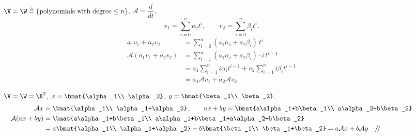 \begin{example}\leavevmode{}
$\V=\W \triangleq \{\text{polynomials with degree} \le n\}$, \quad $\mathcal{A} = \dfrac{d}{dt}$,
\[
v_1=\sum_{i=0}^{n}\alpha_i t^i, \qquad v_2=\sum_{i=0}^{n}\beta_i t^i .
\]
\begin{align*}
a_1v_1+a_2v_2 &= \sum_{i=0}^{n}(a_1\alpha_i+a_2\beta_i)\,t^i\\
\mathcal{A}(a_1v_1+a_2v_2) &= \sum_{i=1}^{n}(a_1\alpha_i+a_2\beta_i)\cdot i\, t^{i-1}\\
&= a_1\sum_{i=1}^{n} i\alpha_i t^{i-1} + a_2\sum_{i=1}^{n} i\beta_i t^{i-1}\\
&= a_1\mathcal{A}v_1+a_2\mathcal{A}v_2
\end{align*}
\end{example}

\begin{example}
$\V=\W=\R^2$, \quad $x=\bmat{\alpha_1\\ \alpha_2}$, \quad $y=\bmat{\beta_1\\ \beta_2}$.
\begin{align*}
\mathcal{A}x &= \bmat{\alpha_1\\ \alpha_1+\alpha_2}, \qquad
ax+by=\bmat{a\alpha_1+b\beta_1\\ a\alpha_2+b\beta_2}\\
\mathcal{A}(ax+by) &= \bmat{a\alpha_1+b\beta_1\\ a\alpha_1+b\beta_1+a\alpha_2+b\beta_2}\\
&= a\bmat{\alpha_1\\ \alpha_1+\alpha_2}+b\bmat{\beta_1\\ \beta_1+\beta_2} = a\mathcal{A}x+b\mathcal{A}y \quad /\!/
\end{align*}
\end{example}

